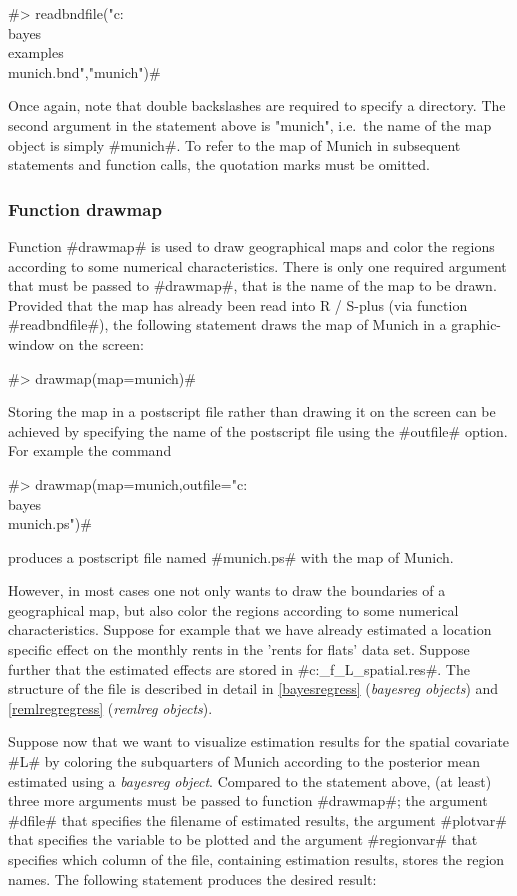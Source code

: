 #> readbndfile("c:\\bayes\\examples\\munich.bnd","munich")#

Once again, note that double backslashes are required to specify a
directory. The second argument in the statement above is "munich",
i.e.~the name of the map object is simply #munich#. To refer to the
map of Munich in subsequent statements and function calls, the
quotation marks must be omitted.

\subsubsection*{Function drawmap}

Function #drawmap# is used to draw geographical maps and color the
regions according to some numerical characteristics. There is only
one required argument that must be passed to #drawmap#, that is the
name of the map to be drawn. Provided that the map has already been
read into R / S-plus (via function #readbndfile#), the following
statement draws the map of Munich in a graphic-window on the screen:

#> drawmap(map=munich)#

Storing the map in a postscript file rather than drawing it on the
screen can be achieved by specifying the name of the postscript
file using the #outfile# option. For example the command

#> drawmap(map=munich,outfile="c:\\bayes\\munich.ps")#

produces a postscript file named #munich.ps# with the map of
Munich.

However, in most cases one not only wants to draw the boundaries of
a geographical map, but also color the regions according to some
numerical characteristics. Suppose for example that we have already
estimated a location specific effect on the monthly rents in the
'rents for flats' data set. Suppose further that the estimated
effects are stored in #c:\bayes\output\reg_f_L_spatial.res#. The
structure of the file is described in detail in
\autoref{bayesregress} ({\em bayesreg objects}) and
\autoref{remlregregress} ({\em remlreg objects}).

Suppose now that we want to visualize estimation results for the
spatial covariate #L# by coloring the subquarters of Munich
according to the posterior mean estimated using a {\em bayesreg
object}. Compared to the statement above, (at least) three more
arguments must be passed to function #drawmap#; the argument #dfile#
that specifies the filename of estimated results, the argument
#plotvar# that specifies the variable to be plotted and the argument
#regionvar# that specifies which column of the file, containing
estimation results, stores the region names. The following statement
produces the desired result:

